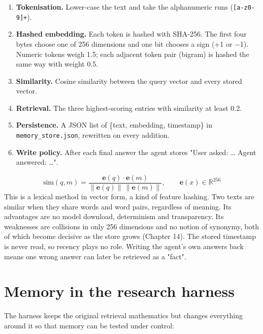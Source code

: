 \documentclass[10.5pt,a4paper,oneside]{report}
\begin{document}
\begin{enumerate}
\item \textbf{Tokenisation.} Lower-case the text and take the alphanumeric runs (\texttt{[a-z0-9]+}).
\item \textbf{Hashed embedding.} Each token is hashed with SHA-256. The first four bytes choose one of 256 dimensions and one bit chooses a sign (+1 or −1). Numeric tokens weigh 1.5; each adjacent token pair (bigram) is hashed the same way with weight 0.5.
\item \textbf{Similarity.} Cosine similarity between the query vector and every stored vector.
\item \textbf{Retrieval.} The three highest-scoring entries with similarity at least 0.2.
\item \textbf{Persistence.} A JSON list of \{text, embedding, timestamp\} in \texttt{memory\_\allowbreak{}store.\allowbreak{}json}, rewritten on every addition.
\item \textbf{Write policy.} After each final answer the agent stores "User asked: … Agent answered: …".
\end{enumerate}
\begin{equation*}\mathrm{sim}(q, m) = \frac{\mathbf{e}(q) \cdot \mathbf{e}(m)}{\lVert \mathbf{e}(q) \rVert \, \lVert \mathbf{e}(m) \rVert}, \qquad \mathbf{e}(x) \in \mathbb{R}^{256}\end{equation*}
This is a lexical method in vector form, a kind of feature hashing. Two texts are similar when they share words and word pairs, regardless of meaning. Its advantages are no model download, determinism and transparency. Its weaknesses are collisions in only 256 dimensions and no notion of synonymy, both of which become decisive as the store grows (Chapter 14). The stored timestamp is never read, so recency plays no role. Writing the agent's own answers back means one wrong answer can later be retrieved as a "fact".

\section{Memory in the research harness}
The harness keeps the original retrieval mathematics but changes everything around it so that memory can be tested under control:
\end{document}
